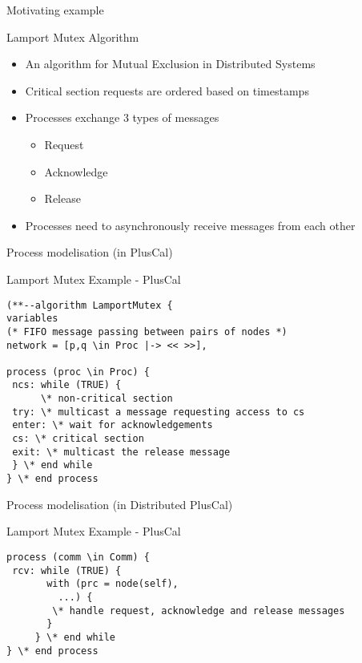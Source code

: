\documentclass{beamer}
\begin{document}
\begin{frame}[fragile]{Motivating example}

\begin{block}{Lamport Mutex Algorithm}
\begin{itemize}
  \item An algorithm for Mutual Exclusion in Distributed Systems
  \item Critical section requests are ordered based on timestamps
  \item Processes exchange 3 types of messages
  \begin{itemize} 
        \item Request
        \item Acknowledge
        \item Release
    \end{itemize}
   \item Processes need to asynchronously receive messages from each other
\end{itemize}
\end{block}
\end{frame}

\begin{frame}[fragile]{Process modelisation (in PlusCal)}
\begin{exampleblock}{Lamport Mutex Example - PlusCal}
\begin{lstlisting}[language=pluscal, frame = none, numbers = none]
(**--algorithm LamportMutex {
variables
(* FIFO message passing between pairs of nodes *)
network = [p,q \in Proc |-> << >>],

process (proc \in Proc) {
 ncs: while (TRUE) {
      \* non-critical section
 try: \* multicast a message requesting access to cs
 enter: \* wait for acknowledgements 
 cs: \* critical section
 exit: \* multicast the release message
 } \* end while
} \* end process
\end{lstlisting}
\end{exampleblock}
\end{frame}

\begin{frame}[fragile]{Process modelisation (in Distributed PlusCal)}
        \begin{exampleblock}{Lamport Mutex Example - PlusCal}
        \begin{lstlisting}[language=pluscal, frame = none, numbers = none]
process (comm \in Comm) {
 rcv: while (TRUE) {
       with (prc = node(self),
         ...) {
        \* handle request, acknowledge and release messages
       }
     } \* end while
} \* end process
\end{lstlisting}
\end{exampleblock}
\end{frame}
\end{document}

